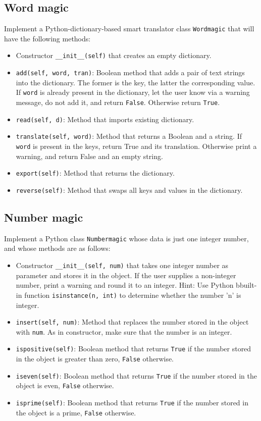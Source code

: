 \subsection{Word magic}

Implement a Python-dictionary-based smart translator class {\tt Wordmagic} that 
will have the following methods:
\begin{itemize}
\item Constructor {\tt \_\_init\_\_(self)} that creates an empty dictionary.
\item {\tt add(self, word, tran)}: Boolean method that adds a pair of text strings into 
      the dictionary. The former is the key, the latter the corresponding value. 
      If {\tt word} is already present in the dictionary,
      let the user know via a warning message, do not add it, and return {\tt False}. 
      Otherwise return {\tt True}.
\item {\tt read(self, d)}: Method that imports existing dictionary.
\item {\tt translate(self, word)}: Method that returns a Boolean and a string. If {\tt word}   
      is present in the keys, return True and its translation. Otherwise print a warning,
      and return False and an empty string.
\item {\tt export(self)}: Method that returns the dictionary.
\item {\tt reverse(self)}: Method that swaps all keys and values in the dictionary.
\end{itemize}


\subsection{Number magic}\label{numbermagic}

Implement a Python class {\tt Numbermagic} whose data is just one integer number, and 
whose methods are as follows:
\begin{itemize}
\item Constructor {\tt \_\_init\_\_(self, num)} that takes one integer number as parameter and stores it in the object. 
      If the user supplies a non-integer number, print a warning and round it to an integer.
      Hint: Use Python bbuilt-in function {\tt isinstance(n, int)} to determine whether 
      the number 'n' is integer.
\item {\tt insert(self, num)}: Method that replaces the number stored in the object with {\tt num}.
      As in constructor, make sure that the number is an integer.
\item {\tt ispositive(self)}: Boolean method that returns {\tt True} if the number stored in the object is 
      greater than zero, {\tt False} otherwise.
\item {\tt iseven(self)}: Boolean method that returns {\tt True} if the number stored in the object is even,
      {\tt False} otherwise.
\item {\tt isprime(self)}: Boolean method that returns {\tt True} if the number stored in the object is a prime,
      {\tt False} otherwise.
\end{itemize}

